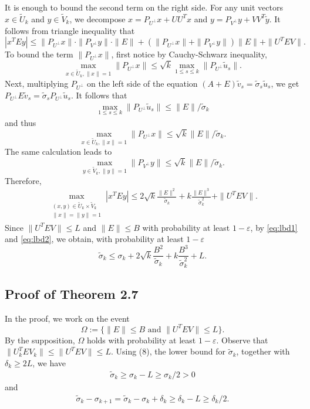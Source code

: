 \documentclass[reqno]{amsart}
\theoremstyle{plain}
\theoremstyle{definition}
\begin{document}
It is enough to bound the second term on the right side. For any unit vectors $x\in \widetilde U_k$ and $y \in \widetilde V_k$, we decompose
$x = P_{U^{\perp} } x + U U^T x$ and  $y = P_{V^{\perp} } y + V V^T \widetilde y. $ It follows from triangle inequality that
$$ |x^T E y| \le  \| P_{U^{\perp} } x\| \cdot \| P_{V^{\perp} } y \|  \cdot \| E\| + (\| P_{U^{\perp} }x \| + \| P_{V^{\perp} } y \| ) \|E\| + \| U^T E V \|. $$
To bound the term $\| P_{U^{\perp} } x\|$, first notice by Cauchy-Schwarz inequality, 
$$\max_{x\in \widetilde U_k, \|x\|=1 } \| P_{U^{\perp} } x\| \le \sqrt{k} \max_{1\le s \le k} \| P_{U^{\perp} } \widetilde u_s \|.$$
Next, multiplying $P_{U^{\perp} }$ on the left side of the equation $(A+E) \widetilde v_s = \widetilde \sigma_s \widetilde u_s$, we get $P_{U^{\perp} } E \widetilde v_s = \widetilde \sigma_s P_{U^{\perp} } \widetilde u_s.$ It follows that
\begin{align}\label{eq:proj}
\max_{1\le s \le k} \| P_{U^{\perp} } \widetilde u_s \| \le {\| E\| }/{\widetilde \sigma_k}
\end{align}
and thus
$$\max_{x\in \widetilde U_k, \|x\|=1 } \| P_{U^{\perp} } x\| \le \sqrt{k} {\| E\| }/{\widetilde \sigma_k}.$$
The same calculation leads to $$\max_{y\in \widetilde V_k, \|y\|=1 } \| P_{V^{\perp} } y\| \le \sqrt{k} {\| E\| }/{\widetilde \sigma_k}.$$  Therefore,
\begin{align}\label{eq:lbd2}
\max_{\substack{(x,y) \in \widetilde U_k \times \widetilde V_k \\ \|x\|=\|y\|=1} } |x^T E y| \le 2 \sqrt{k}\frac{\| E\|^2 }{\widetilde \sigma_k} + k \frac{\| E\|^3 }{\widetilde \sigma_k^2 } + \| U^T E V \|.
\end{align}
Since $\|U^T E V \| \le L$ and $\|E\| \le B$ with probability at least $1-\varepsilon$, by \eqref{eq:lbd1} and \eqref{eq:lbd2}, we obtain, with probability at least $1-\varepsilon$
$$\widetilde \sigma_k \le \sigma_k + 2\sqrt{k} \frac{B^2}{\widetilde \sigma_k} + k \frac{B^3}{\widetilde \sigma_k^2} + L.$$


\subsection{Proof of Theorem 2.7}
In the proof, we work on the event $$\Omega:=\{ \|E\| \le B \text{ and } \|U^T E V\| \le L \}.$$ By the supposition, $\Omega$ holds with probability at least $1-\varepsilon$.
Observe that $\|U_k^T E V_k\| \le \|U^T E V\| \le L.$
Using (8), the lower bound for $\widetilde \sigma_k$, together with $\delta_k \ge 2 L$, we have 
\begin{align*}
\widetilde \sigma_k \ge \sigma_k - L \ge {\sigma_k}/{2}>0
\end{align*}
and 
\begin{align*}
\widetilde \sigma_k - \sigma_{k+1}= {\widetilde \sigma}_k-\sigma_k + \delta_k \ge \delta_k-L \ge {\delta_k}/{2}.
\end{align*}
\end{document}
